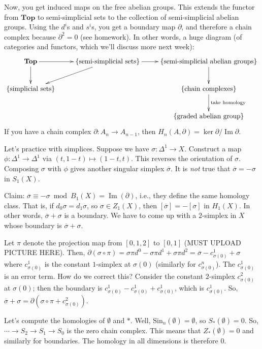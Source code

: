\documentclass{amsart}
\theoremstyle{theorem}
\theoremstyle{definition}
\DeclareMathOperator{\img}{Im}
\newcommand{\Sin}{\mathrm{Sin}}
\begin{document}
Now, you get induced maps on the free abelian groups. This extends the functor from $\mathbf{Top}$ to semi-simplicial sets to the collection of semi-simplicial abelian groups. Using the $d^i$s and $s^i$s, you get a boundary map $\partial$, and therefore a chain complex because $\partial^2=0$ (see homework). In other words, a huge diagram (of categories and functors, which we'll discuss more next week):
\begin{equation*}
\xymatrix{\mathbf{Top}\ar[d]\ar[r] & \{\text{semi-simplicial sets}\}\ar[dl]\ar[r] & \{\text{semi-simplicial abelian groups}\}\ar[d]\\
 \{\text{simplicial sets}\} & & \{\text{chain complexes}\}\ar[d]^{\text{take homology}}\\
 & &\{\text{graded abelian group}\}}
\end{equation*}
If you have a chain complex $\partial:A_n\to A_{n-1}$, then $ H_n(A,\partial)=\ker\partial/\img\partial$.

Let's practice with simplices. Suppose we have $\sigma:\Delta^1\to X$. Construct a map $\phi:\Delta^1\to\Delta^1$ via $(t,1-t)\mapsto (1-t,t)$. This reverses the orientation of $\sigma$. Composing $\sigma$ with $\phi$ gives another singular simplex $\overline{\sigma}$. It is \textit{not} true that $\overline{\sigma}=-\sigma$ in $S_1(X)$.

Claim: $\overline{\sigma}\equiv -\sigma\bmod B_1(X)=\img(\partial)$, i.e., they define the same homology class. That is, if $d_0\sigma=d_1\sigma$, so $\sigma\in Z_1(X)$, then $[\overline{\sigma}]=-[\sigma]$ in $ H_1(X)$. In other words, $\overline{\sigma}+\sigma$ is a boundary. We have to come up with a $2$-simplex in $X$ whose boundary is $\overline{\sigma}+\sigma$.

Let $\pi$ denote the projection map from $[0,1,2]$ to $[0,1]$ (MUST UPLOAD PICTURE HERE). Then, $\partial(\sigma\circ\pi)=\sigma\pi d^0-\sigma\pi d^1 +\sigma\pi d^2=\overline{\sigma}-c^1_{\sigma(0)}+\sigma$ where $c^1_{\sigma(0)}$ is the constant $1$-simplex at $\sigma(0)$ (similarly for $c^n_{\sigma(0)}$). The $c^1_{\sigma(0)}$ is an error term. How do we correct this? Consider the constant $2$-simplex $c^2_{\sigma(0)}$ at $\sigma(0)$; then the boundary is $c^1_{\sigma(0)}-c^1_{\sigma(0)}+c^1_{\sigma(0)}$, which is $c^1_{\sigma(0)}$. So, $\overline{\sigma}+\sigma=\partial(\sigma\circ\pi + c^2_{\sigma(0)})$.

Let's compute the homologies of $\emptyset$ and $\ast$. Well, $\Sin_n(\emptyset)=\emptyset$, so $S_\ast(\emptyset)=0$. So, $\cdots\to S_2\to S_1\to S_0$ is the zero chain complex. This means that $Z_\ast(\emptyset)=0$ and similarly for boundaries. The homology in all dimensions is therefore $0$.
\end{document}
